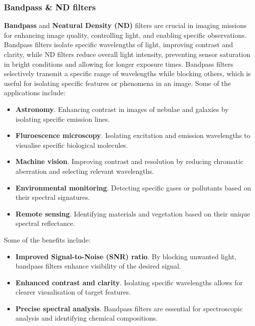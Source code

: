 \documentclass[10pt]{article}
\begin{document}
\begin{multicols}{2}
\subsubsection{Bandpass \& ND filters}
\textbf{Bandpass} and \textbf{Neatural Density (ND)} filters are crucial in imaging missions for enhancing image quality, controlling light, and enabling specific observations. Bandpass filters isolate specific wavelengths of light, improving contrast and clarity, while ND filters reduce overall light intensity, preventing sensor saturation in bright conditions and allowing for longer exposure times.
\newline \newline
Bandpass filters selectively transmit a specific range of wavelengths while blocking others, which is useful for isolating specific features or phenomena in an image. Some of the applications include:
\begin{itemize}
    \item \textbf{Astronomy}. Enhancing contrast in images of nebulae and galaxies by isolating specific emission lines.
    \item \textbf{Fluroescence microscopy}. Isolating excitation and emission wavelengths to visualise specific biological molecules.
    \item \textbf{Machine vision}. Improving contrast and resolution by reducing chromatic aberration and selecting relevant wavelengths.
    \item \textbf{Environmental monitoring}. Detecting specific gases or pollutants based on their spectral signatures.
    \item \textbf{Remote sensing}. Identifying materials and vegetation based on their unique spectral reflectance.
\end{itemize}
Some of the benefits include:
\begin{itemize}
    \item \textbf{Improved Signal-to-Noise (SNR) ratio}. By blocking unwanted light, bandpass filters enhance visibility of the desired signal.
    \item \textbf{Enhanced contrast and clarity}. Isolating specific wavelengths allows for clearer visualisation of target features.
    \item \textbf{Precise spectral analysis}. Bandpass filters are essential for spectroscopic analysis and identifying chemical compositions.
\end{itemize}


\end{multicols}
\end{document}
